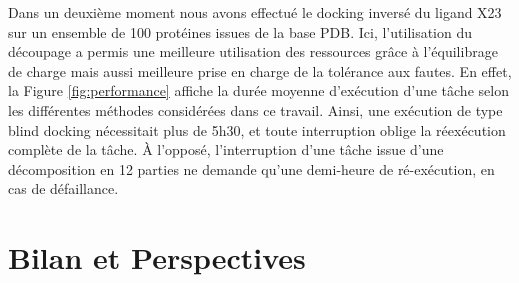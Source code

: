 
 
Dans un deuxième moment nous avons effectué le docking inversé du ligand X23 sur un ensemble de 100 protéines issues de la base PDB. Ici, l'utilisation du découpage a permis une  meilleure utilisation des ressources grâce à l'équilibrage de charge %
mais aussi meilleure prise en charge de la tolérance aux fautes. En effet, la Figure \ref{fig:performance} affiche la durée moyenne d'exécution d'une tâche selon les différentes méthodes considérées dans ce travail. Ainsi, une exécution de type blind docking nécessitait plus de 5h30, et toute interruption oblige la réexécution complète de la tâche. À l'opposé, l'interruption d'une tâche issue d'une décomposition en 12 parties ne demande qu'une demi-heure de ré-exécution, en cas de défaillance.  


 

\section{Bilan et Perspectives} \label{sec:disc}








